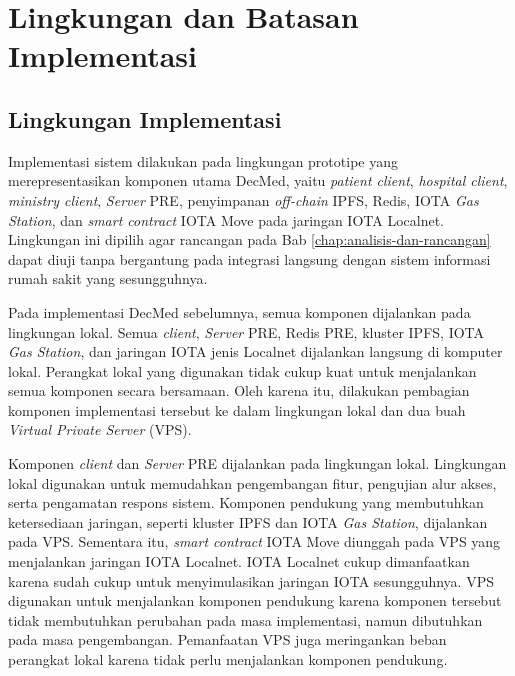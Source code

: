 \section{Lingkungan dan Batasan Implementasi}
\label{sec:lingkungan-dan-batasan-implementasi}

\subsection{Lingkungan Implementasi}
\label{subsec:lingkungan-implementasi}

Implementasi sistem dilakukan pada lingkungan prototipe yang merepresentasikan komponen utama DecMed, yaitu \textit{patient client}, \textit{hospital client}, \textit{ministry client}, \textit{Server} PRE, penyimpanan \textit{off-chain} IPFS, Redis, IOTA \textit{Gas Station}, dan \textit{smart contract} IOTA Move pada jaringan IOTA Localnet. Lingkungan ini dipilih agar rancangan pada Bab \ref{chap:analisis-dan-rancangan} dapat diuji tanpa bergantung pada integrasi langsung dengan sistem informasi rumah sakit yang sesungguhnya.

Pada implementasi DecMed sebelumnya, semua komponen dijalankan pada lingkungan lokal. Semua \textit{client}, \textit{Server} PRE, Redis PRE, kluster IPFS, IOTA \textit{Gas Station}, dan jaringan IOTA jenis Localnet dijalankan langsung di komputer lokal. Perangkat lokal yang digunakan tidak cukup kuat untuk menjalankan semua komponen secara bersamaan. Oleh karena itu, dilakukan pembagian komponen implementasi tersebut ke dalam lingkungan lokal dan dua buah \textit{Virtual Private Server} (VPS).

Komponen \textit{client} dan \textit{Server} PRE dijalankan pada lingkungan lokal. Lingkungan lokal digunakan untuk memudahkan pengembangan fitur, pengujian alur akses, serta pengamatan respons sistem. Komponen pendukung yang membutuhkan ketersediaan jaringan, seperti kluster IPFS dan IOTA \textit{Gas Station}, dijalankan pada VPS. Sementara itu, \textit{smart contract} IOTA Move diunggah pada VPS yang menjalankan jaringan IOTA Localnet. IOTA Localnet cukup dimanfaatkan karena sudah cukup untuk menyimulasikan jaringan IOTA sesungguhnya. VPS digunakan untuk menjalankan komponen pendukung karena komponen tersebut tidak membutuhkan perubahan pada masa implementasi, namun dibutuhkan pada masa pengembangan. Pemanfaatan VPS juga meringankan beban perangkat lokal karena tidak perlu menjalankan komponen pendukung.

